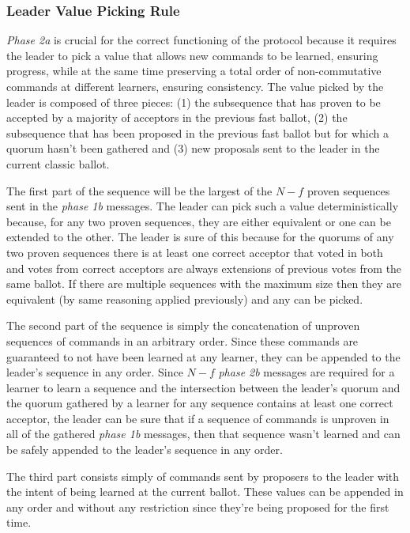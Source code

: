 \subsubsection{Leader Value Picking Rule} \textit{Phase 2a} is crucial for the correct functioning of the protocol because it requires the leader to pick a value that allows new commands to be learned, ensuring progress, while at the same time preserving a total order of non-commutative commands at different learners, ensuring consistency. The value picked by the leader is composed of three pieces: (1) the subsequence that has proven to be accepted by a majority of acceptors in the previous fast ballot, (2) the subsequence that has been proposed in the previous fast ballot but for which a quorum hasn't been gathered and (3) new proposals sent to the leader in the current classic ballot. \par
The first part of the sequence will be the largest of the $N-f$ proven sequences sent in the \textit{phase 1b} messages. The leader can pick such a value deterministically because, for any two proven sequences, they are either equivalent or one can be extended to the other. The leader is sure of this because for the quorums of any two proven sequences there is at least one correct acceptor that voted in both and votes from correct acceptors are always extensions of previous votes from the same ballot. If there are multiple sequences with the maximum size then they are equivalent (by same reasoning applied previously) and any can be picked. \par
The second part of the sequence is simply the concatenation of unproven sequences of commands in an arbitrary order. Since these commands are guaranteed to not have been learned at any learner, they can be appended to the leader's sequence in any order. Since $N-f$ \textit{phase 2b} messages are required for a learner to learn a sequence and the intersection between the leader's quorum and the quorum gathered by a learner for any sequence contains at least one correct acceptor, the leader can be sure that if a sequence of commands is unproven in all of the gathered \textit{phase 1b} messages, then that sequence wasn't learned and can be safely appended to the leader's sequence in any order. \par 
The third part consists simply of commands sent by proposers to the leader with the intent of being learned at the current ballot. These values can be appended in any order and without any restriction since they're being proposed for the first time.

